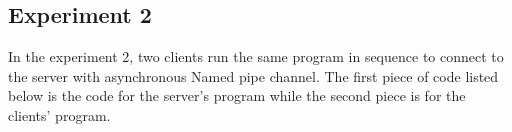 \subsection{Experiment 2}
In the experiment 2, two clients run the same program in sequence to connect to the server with asynchronous Named pipe channel. The first piece of code listed below is the code for the server's program while the second piece is for the clients' program.


